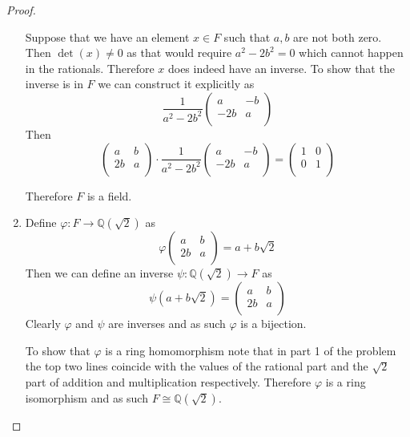 \documentclass[10pt]{article}
\newcommand{\sk}{\vskip 10mm}
\newcommand{\bb}[1]{\mathbb{#1}}
\theoremstyle{plain}
\theoremstyle{remark}
\begin{document}
\begin{proof}
\begin{enumerate}
    Suppose that we have an element $x\in F$ such that $a,b$ are not both zero.
    Then $\det(x)\neq 0$ as that would require $a^2-2b^2=0$ which cannot happen
    in the rationals. Therefore $x$ does indeed have an inverse. To show that
    the inverse is in $F$ we can construct it explicitly as
    \[
      \frac{1}{a^2-2b^2}
      \left(
        \begin{array}{cc}
          a & -b\\
          -2b & a\\
        \end{array}
      \right)
    \]
    Then
    \[\left(
        \begin{array}{cc}
          a&b\\
          2b&a\\
        \end{array}
      \right)\cdot
      \frac{1}{a^2-2b^2}
      \left(
        \begin{array}{cc}
          a & -b\\
          -2b & a\\
        \end{array}
      \right)
      =
      \left(
        \begin{array}{cc}
          1&0\\
          0&1\\
        \end{array}
      \right)\]

    Therefore $F$ is a field.
  \item Define $\varphi:F\rightarrow\bb{Q}(\sqrt{2})$ as
    \[ \varphi
      \left(
        \begin{array}{cc}
          a&b\\
          2b&a\\

        \end{array}
      \right)=a+b\sqrt{2}\]
    Then we can define an inverse $\psi:\bb{Q}(\sqrt{2})\rightarrow F$ as
    \[ \psi(a+b\sqrt{2})=
      \left(
        \begin{array}{cc}
          a&b\\
          2b&a\\
        \end{array}
      \right)\]
    Clearly $\varphi$ and $\psi$ are inverses and as such $\varphi$ is a bijection.

    To show that $\varphi$ is a ring homomorphism note that in part 1 of the
    problem the top two lines coincide with the values of the rational
    part and the $\sqrt{2}$ part of addition and multiplication respectively.
    Therefore $\varphi$ is a ring isomorphism and as such $F\cong \bb{Q}(\sqrt{2})$.
  \end{enumerate}
\end{proof}

\sk

\end{document}
